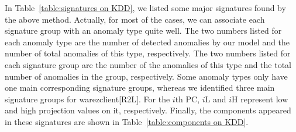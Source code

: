 In Table~\ref{table:signatures on KDD}, we listed some major signatures found by the above method. Actually, for most of the cases, we can associate each signature group with an anomaly type quite well.  The two numbers listed for each anomaly type are the number of detected anomalies by our model and the number of total anomalies of this type, respectively. The two numbers listed for each signature group are the number of the anomalies of this type and the total number of anomalies in the group, respectively. Some anomaly types only have one main corresponding signature groups, whereas we identified three main signature groups for warezclient{[}R2L{]}. For the $i$th PC, $i$L and $i$H represent low and high projection values on it, respectively.  Finally, the components appeared in these signatures are shown in Table~\ref{table:components on KDD}.

